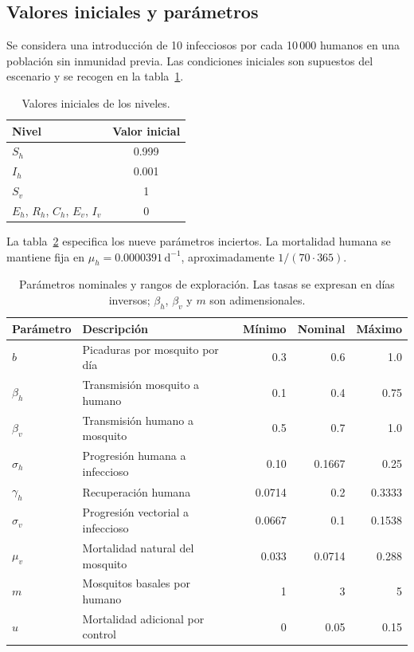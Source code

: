 \documentclass[12pt,spanish,oneside,openany]{MastersDoctoralThesis}
\numberwithin{equation}{section}
\begin{document}
\subsection{Valores iniciales y parámetros}
Se considera una introducción de 10 infecciosos por cada 10\,000 humanos en una población sin inmunidad previa. Las condiciones iniciales son supuestos del escenario y se recogen en la tabla~\ref{tab:iniciales}.
\begin{table}[!htbp]\centering
\caption{Valores iniciales de los niveles.}\label{tab:iniciales}
\begin{tabular}{lc}\toprule
Nivel & Valor inicial\\\midrule
$S_h$ & 0.999\\
$I_h$ & 0.001\\
$S_v$ & 1\\
$E_h$, $R_h$, $C_h$, $E_v$, $I_v$ & 0\\\bottomrule
\end{tabular}
\end{table}

La tabla~\ref{tab:parametros} especifica los nueve parámetros inciertos. La mortalidad humana se mantiene fija en $\mu_h=0.0000391\,\mathrm{d}^{-1}$, aproximadamente $1/(70\cdot365)$.
\begin{table}[!htbp]\centering
\caption{Parámetros nominales y rangos de exploración. Las tasas se expresan en días inversos; $\beta_h$, $\beta_v$ y $m$ son adimensionales.}\label{tab:parametros}
\small
\begin{tabularx}{\linewidth}{lXrrr}\toprule
Parámetro & Descripción & Mínimo & Nominal & Máximo\\\midrule
$b$ & Picaduras por mosquito por día & 0.3 & 0.6 & 1.0\\
$\beta_h$ & Transmisión mosquito a humano & 0.1 & 0.4 & 0.75\\
$\beta_v$ & Transmisión humano a mosquito & 0.5 & 0.7 & 1.0\\
$\sigma_h$ & Progresión humana a infeccioso & 0.10 & 0.1667 & 0.25\\
$\gamma_h$ & Recuperación humana & 0.0714 & 0.2 & 0.3333\\
$\sigma_v$ & Progresión vectorial a infeccioso & 0.0667 & 0.1 & 0.1538\\
$\mu_v$ & Mortalidad natural del mosquito & 0.033 & 0.0714 & 0.288\\
$m$ & Mosquitos basales por humano & 1 & 3 & 5\\
$u$ & Mortalidad adicional por control & 0 & 0.05 & 0.15\\\bottomrule
\end{tabularx}
\end{table}
\end{document}
